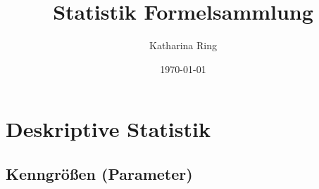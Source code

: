 \documentclass[10pt]{article}
\begin{document}
\title{Statistik Formelsammlung}
\author{Katharina Ring}
\date{\today}
\maketitle

\clearpage

\tableofcontents

\clearpage




\section{Deskriptive Statistik}

\raggedright
\setlength{\parindent}{15pt}

\subsection{Kenngrößen (Parameter)}
\end{document}
